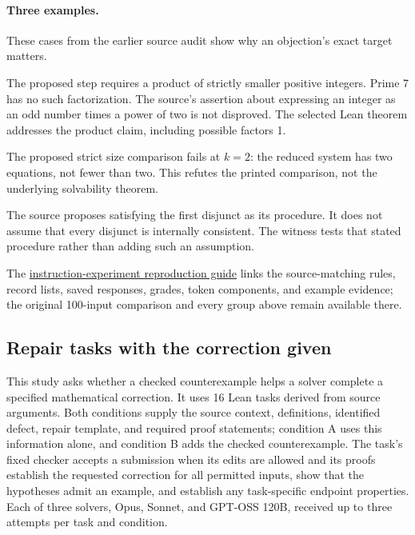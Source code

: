 \paragraph{Three examples.}
These cases from the earlier source audit show why an objection's exact target matters.
\begin{description}[style=nextline,leftmargin=0pt]
\item[\path{mse_25914__ans25916}: a local proof step.]
The proposed step requires a product of strictly smaller positive integers. Prime 7 has no such factorization. The source's assertion about expressing an integer as an odd number times a power of two is not disproved. The selected Lean theorem addresses the product claim, including possible factors 1.
\item[\path{mse_1513740__ans1513768}: a local size comparison.]
The proposed strict size comparison fails at $k=2$: the reduced system has two equations, not fewer than two. This refutes the printed comparison, not the underlying solvability theorem.
\item[\path{SE_cs_12812__a12823}: an algorithmic claim.]
The source proposes satisfying the first disjunct as its procedure. It does not assume that every disjunct is internally consistent. The witness tests that stated procedure rather than adding such an assumption.
\end{description}
The \href{https://github.com/qqliu/CoPEER/blob/main/studies/instructions/README.md}{instruction-experiment reproduction guide} links the source-matching rules, record lists, saved responses, grades, token components, and example evidence; the original 100-input comparison and every group above remain available there.

\subsection{Repair tasks with the correction given}
\label{app:repair-study}
This study asks whether a checked counterexample helps a solver complete a specified mathematical correction. It uses 16 Lean tasks derived from source arguments. Both conditions supply the source context, definitions, identified defect, repair template, and required proof statements; condition A uses this information alone, and condition B adds the checked counterexample. The task's fixed checker accepts a submission when its edits are allowed and its proofs establish the requested correction for all permitted inputs, show that the hypotheses admit an example, and establish any task-specific endpoint properties. Each of three solvers, Opus, Sonnet, and GPT-OSS 120B, received up to three attempts per task and condition.

